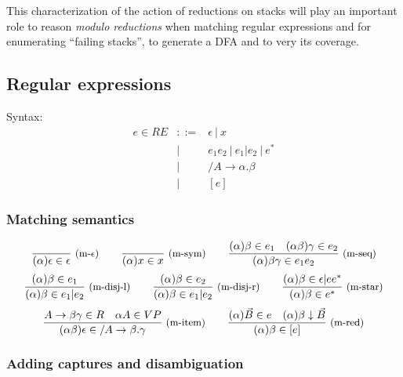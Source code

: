 \documentclass{article}
\begin{document}
This characterization of the action of reductions on stacks will play an important role to reason {\em modulo reductions} when matching regular expressions and for enumerating ``failing stacks'', to generate a DFA and to very its coverage.


\subsection{Regular expressions}

Syntax:
\[
\begin{array}{rrl}
  e \in RE &::=& \epsilon\ |\ x
  \\  &|& e_1 e_2 \ |\ e_1 | e_2 \ |\ e^*
  \\  &|& /A \rightarrow \alpha.\beta
  \\  &|& [e]
\end{array}
\]

\subsubsection{Matching semantics}

\newcommand\dre[3]{(#1) #2 \in #3}

\[
\Rule{}
     {\dre{\alpha}{\epsilon}{\epsilon}}
     {m-$\epsilon$}
\qquad
\Rule{}
     {\dre{\alpha}{x}{x}}
     {m-sym}
\qquad
\Rule{\dre{\alpha}{\beta}{e_1}\quad\dre{\alpha\beta}{\gamma}{e_2}}
     {\dre{\alpha}{\beta\gamma}{e_1e_2}}
     {m-seq}
\]
\[
\Rule{\dre{\alpha}{\beta}{e_1}}
     {\dre{\alpha}{\beta}{e_1|e_2}}
     {m-disj-l}
\qquad
\Rule{\dre{\alpha}{\beta}{e_2}}
     {\dre{\alpha}{\beta}{e_1|e_2}}
     {m-disj-r}
\qquad
\Rule{\dre{\alpha}{\beta}{\epsilon|ee^*}}
     {\dre{\alpha}{\beta}{e^*}}
     {m-star}
\]
\[
\Rule{A \rightarrow \beta \gamma \in R \quad \alpha A \in VP}
     {\dre{\alpha\beta}{\epsilon}{/A\rightarrow \beta.\gamma}}
     {m-item}
\qquad
\Rule{\dre{\alpha}{\vec{B}}{e} \quad \dred{\alpha}{\beta}{\vec B}}
     {\dre{\alpha}{\beta}{[e]}}
     {m-red}
\]


\subsubsection{Adding captures and disambiguation}
\end{document}

